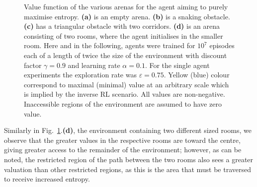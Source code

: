 \documentclass{article}
\begin{document}
\begin{figure}[ht]
\centering
{}
\caption{Value function of the various arenas for the agent aiming to purely maximise entropy. 
\textbf{(a)} is an empty arena. \textbf{(b)} is a snaking obstacle. \textbf{(c)} has a triangular obstacle with two corridors. \textbf{(d)} is an arena consisting of two rooms, where the agent initialises in the smaller room.\label{entfigs}
Here and in the following, agents were trained for $10^7$ episodes each of a length of 
twice the size of the environment with discount factor $\gamma=0.9$ and 
learning rate $\alpha=0.1$. 
For the single agent experiments the exploration rate was $\varepsilon=0.75$. 
	Yellow (blue) colour correspond to maximal (minimal) value at an 
arbitrary scale which is implied by the inverse RL scenario. 
	All values are non-negative. Inaccessible regions of the environment 
are assumed to have zero value.}
\end{figure}

Similarly in Fig.~\ref{entfigs}.\textbf{(d)}, the environment containing two different sized rooms, we observe that the greater values in the respective rooms are toward the centre, giving greater access to the remainder of the environment; however, as can be noted, the restricted region of the path between the two rooms also sees a greater valuation than other restricted regions, as this is the area that must be traversed to receive increased entropy.
\end{document}

